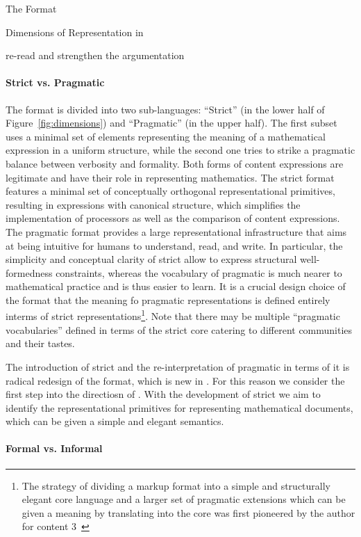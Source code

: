 \begin{omgroup}[creators=miko,id=spec-intro]{The \omdoc Format}
\begin{omgroup}[id=syntax-semantics]{Dimensions of Representation in \omdoc}
\begin{newpart}{re-read and strengthen the argumentation}
\paragraph{Strict vs. Pragmatic} The \omdoc format is divided into two sub-languages:
``Strict'' \omdoc (in the lower half of Figure~\ref{fig:dimensions}) and ``Pragmatic''
\omdoc (in the upper half). The first subset uses a minimal set of elements representing the meaning of a
mathematical expression in a uniform structure, while the second one tries to strike a
pragmatic balance between verbosity and formality. Both forms of content expressions are
legitimate and have their role in representing mathematics. The strict \omdoc format
features a minimal set of conceptually orthogonal representational primitives, resulting
in expressions with canonical structure, which simplifies the implementation of \omdoc
processors as well as the comparison of content expressions.  The pragmatic \omdoc
format provides a large representational infrastructure that aims at being intuitive for
humans to understand, read, and write. In particular, the simplicity and conceptual clarity of strict \omdoc allow to
express structural well-formedness constraints, whereas the vocabulary of pragmatic \omdoc
is much nearer to mathematical practice and is thus easier to learn. It is a crucial
design choice of the \omdoc format that the meaning fo pragmatic representations is
defined entirely interms of strict representations\footnote{The strategy of dividing a
  markup format into a simple and structurally elegant core language and a larger set of
  pragmatic extensions which can be given a meaning by translating into the core was first
  pioneered by the author for content {\mathml}3~\cite{CarlisleEd:MathML08}}. Note that
there may be multiple ``pragmatic vocabularies'' defined in terms of the strict core
catering to different communities and their tastes.

The introduction of strict \omdoc and the re-interpretation of pragmatic \omdoc in
terms of it is radical redesign of the \omdoc format, which is new in {}.
For this reason we consider {} the first step into the directiosn of
{}. With the development of strict \omdoc we aim to identify the
representational primitives for representing mathematical documents, which can be given a
simple and elegant semantics.

\paragraph{Formal vs. Informal} 


\end{newpart}
\end{omgroup}
\end{omgroup}
